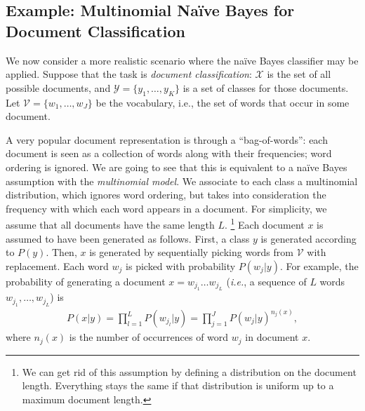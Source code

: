 \subsection{Example: Multinomial Na\"{i}ve Bayes for Document Classification}

We now consider a more realistic scenario where the na\"ive Bayes classifier may be applied. 
Suppose that the task is \emph{document classification}: 
$\mathcal{X}$ is the set of all possible documents, and $\mathcal{Y}=\{y_1,\ldots,y_K\}$ is a set of classes for those documents. 
Let $\mathcal{V} = \{w_1,\ldots,w_J\}$ be the vocabulary, i.e., the set of words that occur in some document. 

A very popular document representation is through a ``bag-of-words'': each document is seen as a collection of words along with 
their frequencies; word ordering is ignored. We are going to see that this is equivalent to a na\"ive Bayes assumption with the \emph{multinomial model}.%
We associate to each class a multinomial distribution, which ignores word ordering, but takes into consideration the 
frequency with which each word appears in a document. For simplicity, we assume that all documents have the same length $L$.%
\footnote{We can get rid of this assumption by defining a distribution on the document length. Everything stays the same 
if that distribution is uniform up to a maximum document length.} %
Each document $x$ is assumed to have been generated as follows. First, a class $y$ is generated according to $P(y)$. Then, 
$x$ is generated by sequentially picking words from $\mathcal{V}$ with replacement. Each word $w_j$ is picked with probability $P(w_j|y)$. 
For example, the probability of generating a document $x = w_{j_1}\ldots w_{j_L}$ (\emph{i.e.}, a sequence of 
$L$ words $w_{j_1},\ldots,w_{j_L}$) is 
\begin{eqnarray}
P(x|y) = \prod_{l=1}^L P(w_{j_l}|y) = \prod_{j=1}^J P(w_j|y)^{n_j(x)},
\end{eqnarray}
where $n_j(x)$ is the number of occurrences of word $w_j$ in document $x$. 

